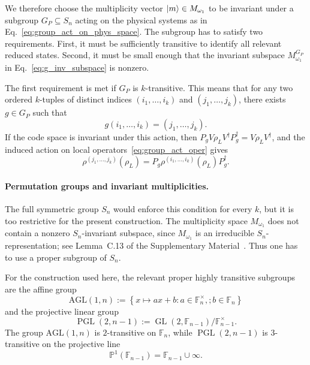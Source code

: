 \documentclass[10pt,twocolumn,superscriptaddress,aps,amsmath,amssymb,citeautoscript,floatfix,prx]{revtex4-2}
\theoremstyle{plain}
\theoremstyle{plain}
\theoremstyle{plain}
\theoremstyle{plain}
\theoremstyle{plain}
\theoremstyle{plain}
\begin{document}
We therefore choose the multiplicity vector $\ket m\in M_{\omega_1}$ to be invariant under a subgroup $G_P\subseteq S_n$ acting on the physical systems as in Eq.~\eqref{eq:group_act_on_phys_space}. The subgroup has to satisfy two requirements. First, it must be sufficiently transitive to identify all relevant reduced states. Second, it must be small enough that the invariant subspace $M_{\omega_1}^{G_P}$ in Eq.~\eqref{eq:g_inv_subspace} is nonzero.

The first requirement is met if $G_P$ is $k$-transitive. This means that for any two ordered $k$-tuples of distinct indices $(i_1,\ldots,i_k)$ and $(j_1,\ldots,j_k)$, there exists $g\in G_P$ such that
$$
g(i_1,\ldots,i_k)=(j_1,\ldots,j_k).
$$
If the code space is invariant under this action, then $P_gV\rho_LV^\dagger P_g^\dagger=V\rho_LV^\dagger$, and the induced action on local operators~\eqref{eq:group_act_oper} gives
$$
\rho^{(j_1,\ldots,j_k)}(\rho_L)
=
P_g
\rho^{(i_1,\ldots,i_k)}(\rho_L)
P_g^\dagger .
$$

\paragraph{Permutation groups and invariant multiplicities.}

The full symmetric group $S_n$ would enforce this condition for every $k$, but it is too restrictive for the present construction. The multiplicity space $M_{\omega_1}$ does not contain a nonzero $S_n$-invariant subspace, since $M_{\omega_1}$ is an irreducible $S_n$-representation; see Lemma~C.13 of the Supplementary Material~\cite{SuppMat}. Thus one has to use a proper subgroup of $S_n$.

For the construction used here, the relevant proper highly transitive subgroups are the affine group
\begin{equation}\label{eq:AGL_def}
\mathrm{AGL}(1,n)
:=
\left\{
x\mapsto ax+b:
a\in\mathbb F_n^\times,;
b\in\mathbb F_n
\right\}
\end{equation}
and the projective linear group
\begin{equation}\label{eq:PGL_def}
\operatorname{PGL}(2,n-1)
:=
\operatorname{GL}\left(2,\mathbb F_{n-1}\right)
/\mathbb F_{n-1}^\times .
\end{equation}
The group $\mathrm{AGL}(1,n)$ is $2$-transitive on $\mathbb F_n$, while $\operatorname{PGL}(2,n-1)$ is $3$-transitive on the projective line
$$
\mathbb P^1(\mathbb F_{n-1})
=
\mathbb F_{n-1}\cup{\infty}.
$$
\end{document}
